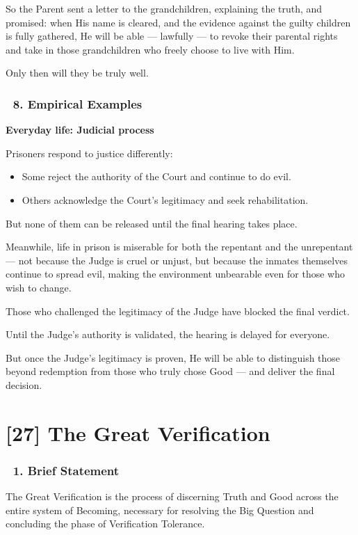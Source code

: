 \documentclass[12pt]{article}
\begin{document}
So the Parent sent a letter to the grandchildren, explaining the truth, and promised: when His name is cleared, and the evidence against the guilty children is fully gathered, He will be able — lawfully — to revoke their parental rights and take in those grandchildren who freely choose to live with Him.

Only then will they be truly well.

\subsubsection*{🔹 8. Empirical Examples}

\textbf{Everyday life: Judicial process}

Prisoners respond to justice differently:

\begin{itemize}
\item Some reject the authority of the Court and continue to do evil.
\item Others acknowledge the Court's legitimacy and seek rehabilitation.
\end{itemize}

But none of them can be released until the final hearing takes place.

Meanwhile, life in prison is miserable for both the repentant and the unrepentant — not because the Judge is cruel or unjust, but because the inmates themselves continue to spread evil, making the environment unbearable even for those who wish to change.

Those who challenged the legitimacy of the Judge have blocked the final verdict.

Until the Judge's authority is validated, the hearing is delayed for everyone.

But once the Judge's legitimacy is proven, He will be able to distinguish those beyond redemption from those who truly chose Good — and deliver the final decision.



\section*{[27] The Great Verification}

\subsubsection*{🔹 1. Brief Statement}

The Great Verification is the process of discerning Truth and Good across the entire system of Becoming, necessary for resolving the Big Question and concluding the phase of Verification Tolerance.
\end{document}
